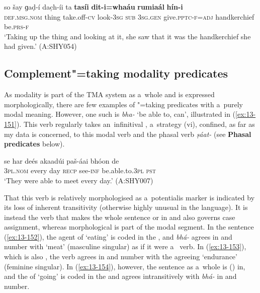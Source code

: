 \begin{exe}
\ex
\label{ex:13-150}
\gll so šay ɡaḍ-í dac̣h-íi ta \textbf{tasíi} \textbf{dit-i=whaáu} \textbf{rumiaál} \textbf{hín-i}\\
\textsc{def.msg.nom} thing take.off-\textsc{cv} look-\textsc{3sg} \textsc{sub} \textsc{3sg.gen} give.\textsc{pptc-f}=\textsc{adj} handkerchief be.\textsc{prs-f}\\
\glt `Taking up the thing and looking at it, she saw that it was the handkerchief she had given.' (A:SHY054)
\end{exe}

\subsection{Complement"=taking modality predicates}
\label{subsec:13-5-2}

 As modality is part of the TMA system as a~whole and is expressed morphologically, there are few examples of "=taking predicates with a~purely modal meaning. However, one such  is \textit{bha-} `be able to, can', illustrated in (\ref{ex:13-151}). This verb regularly takes an~infinitival , a~strategy (vi), confined, as far as my data is concerned, to this modal verb and the phasal verb \textit{ṣáat-} (see \textbf{Phasal predicates} below).

\begin{exe}
\ex
\label{ex:13-151}
\gll se har deés akaadúi paš-áai bhóon de\\
\textsc{3pl.nom} every day \textsc{recp} see-\textsc{inf} be.able.to.\textsc{3pl} \textsc{pst}\\
\glt `They were able to meet every day.' (A:SHY007) 
\end{exe}

That this verb is relatively morphologised as a~potentialis marker is indicated by its loss of inherent transitivity (otherwise highly unusual in the language). It is instead the  verb that makes the whole sentence  or in and also governs case assignment, whereas morphological  is part of the modal segment. In the   sentence (\ref{ex:13-152}), the agent of `eating' is coded in the , and \textit{bhá-} agrees in  and number with `meat' (masculine singular) as if it were a~ verb. In (\ref{ex:13-153}), which is also  , the verb agrees in  and number with the agreeing  `endurance' (feminine singular). In (\ref{ex:13-154}), however, the sentence as a~whole is () in, and the  of `going' is coded in the  and agrees intransitively with \textit{bhá-} in  and number.


